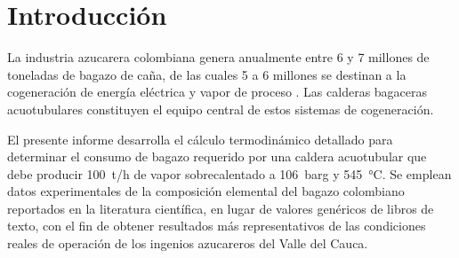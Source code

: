 \section{Introducción}

La industria azucarera colombiana genera anualmente entre 6 y 7 millones de toneladas de bagazo de caña, de las cuales 5 a 6 millones se destinan a la cogeneración de energía eléctrica y vapor de proceso \cite{sac2020}. Las calderas bagaceras acuotubulares constituyen el equipo central de estos sistemas de cogeneración.

El presente informe desarrolla el cálculo termodinámico detallado para determinar el consumo de bagazo requerido por una caldera acuotubular que debe producir 100~t/h de vapor sobrecalentado a \SI{106}{barg} y \SI{545}{\celsius}. Se emplean datos experimentales de la composición elemental del bagazo colombiano reportados en la literatura científica, en lugar de valores genéricos de libros de texto, con el fin de obtener resultados más representativos de las condiciones reales de operación de los ingenios azucareros del Valle del Cauca.
